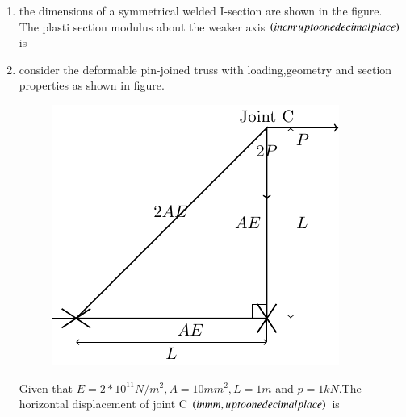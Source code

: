 \documentclass[journal]{IEEEtran}
\begin{document}
\begin{enumerate}
\begin{figure}[h!]
\end{figure}
 \item the dimensions of a symmetrical welded I-section are shown in the figure.\\
 
 The plasti section modulus about the weaker axis $\left(in cm^,up to one decimal place\right)$ is\\
 \item consider the deformable pin-joined truss with loading,geometry and section properties as shown in figure.\\

 \begin{figure}[h!]
         \centering
        \includegraphics[width=0.7\linewidth]{figure/fig2/fig2.pdf}
		\caption{}
        \label{stemplot}

\end{figure}

 Given that $E = 2 * 10^{11} N/m^{2},A=10 mm^{2},L=1 m$ and $p=1 kN$.The horizontal displacement of joint C $\left(in mm,up to one decimal place\right)$ is\\


\end{enumerate}
\end{document}
